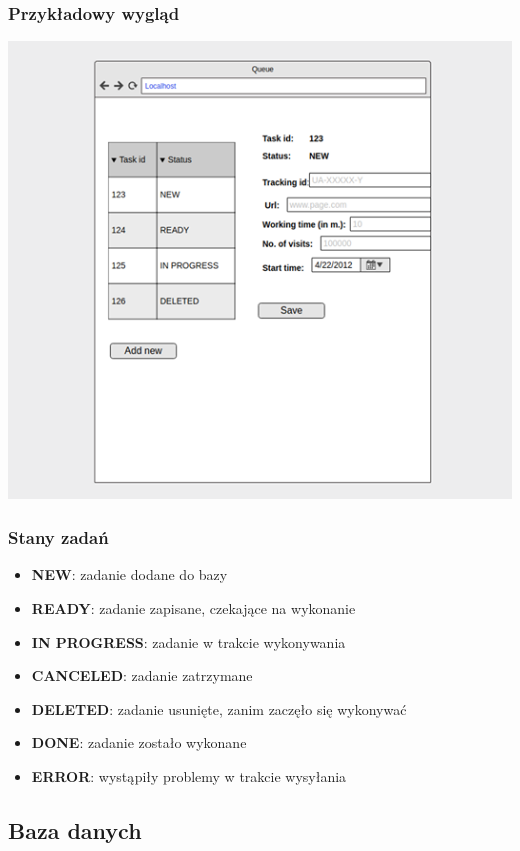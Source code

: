 \documentclass{article}
\begin{document}
\subsubsection{Przykładowy wygląd}
\begin{center}\includegraphics[scale=0.75]{ui}\end{center}

\subsubsection{Stany zadań}

\begin{itemize}
\item \textbf{NEW}: zadanie dodane do bazy
\item \textbf{READY}: zadanie zapisane, czekające na wykonanie
\item \textbf{IN PROGRESS}: zadanie w trakcie wykonywania
\item \textbf{CANCELED}: zadanie zatrzymane
\item \textbf{DELETED}: zadanie usunięte, zanim zaczęło się wykonywać
\item \textbf{DONE}: zadanie zostało wykonane
\item \textbf{ERROR}: wystąpiły problemy w trakcie wysyłania
\end{itemize}

\subsection{Baza danych}
\end{document}
